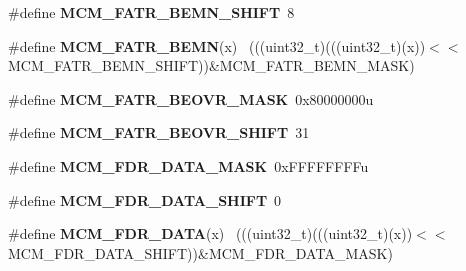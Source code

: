 \begin{DoxyCompactItemize}
\item 
\hypertarget{group___m_c_m___register___masks_ga88340d50a4a5e89775d655534b423fa2}{}\#define {\bfseries M\+C\+M\+\_\+\+F\+A\+T\+R\+\_\+\+B\+E\+M\+N\+\_\+\+S\+H\+I\+F\+T}~8\label{group___m_c_m___register___masks_ga88340d50a4a5e89775d655534b423fa2}

\item 
\hypertarget{group___m_c_m___register___masks_ga79d7604d5e9570d49dd65bf1c66ef959}{}\#define {\bfseries M\+C\+M\+\_\+\+F\+A\+T\+R\+\_\+\+B\+E\+M\+N}(x)                                              ~(((uint32\+\_\+t)(((uint32\+\_\+t)(x))$<$$<$M\+C\+M\+\_\+\+F\+A\+T\+R\+\_\+\+B\+E\+M\+N\+\_\+\+S\+H\+I\+F\+T))\&M\+C\+M\+\_\+\+F\+A\+T\+R\+\_\+\+B\+E\+M\+N\+\_\+\+M\+A\+S\+K)\label{group___m_c_m___register___masks_ga79d7604d5e9570d49dd65bf1c66ef959}

\item 
\hypertarget{group___m_c_m___register___masks_ga27c59e31d119c803390a03833ded4882}{}\#define {\bfseries M\+C\+M\+\_\+\+F\+A\+T\+R\+\_\+\+B\+E\+O\+V\+R\+\_\+\+M\+A\+S\+K}~0x80000000u\label{group___m_c_m___register___masks_ga27c59e31d119c803390a03833ded4882}

\item 
\hypertarget{group___m_c_m___register___masks_ga081bb0512d73dc58b5cde4f3291b48da}{}\#define {\bfseries M\+C\+M\+\_\+\+F\+A\+T\+R\+\_\+\+B\+E\+O\+V\+R\+\_\+\+S\+H\+I\+F\+T}~31\label{group___m_c_m___register___masks_ga081bb0512d73dc58b5cde4f3291b48da}

\item 
\hypertarget{group___m_c_m___register___masks_ga422d011b3e2b1f137c16ff2c9771819b}{}\#define {\bfseries M\+C\+M\+\_\+\+F\+D\+R\+\_\+\+D\+A\+T\+A\+\_\+\+M\+A\+S\+K}~0x\+F\+F\+F\+F\+F\+F\+F\+Fu\label{group___m_c_m___register___masks_ga422d011b3e2b1f137c16ff2c9771819b}

\item 
\hypertarget{group___m_c_m___register___masks_gaafbf98dfdf92b662f1221476bb031602}{}\#define {\bfseries M\+C\+M\+\_\+\+F\+D\+R\+\_\+\+D\+A\+T\+A\+\_\+\+S\+H\+I\+F\+T}~0\label{group___m_c_m___register___masks_gaafbf98dfdf92b662f1221476bb031602}

\item 
\hypertarget{group___m_c_m___register___masks_ga7bd9c3cfc0b39dfbe8e2d01bad3f2425}{}\#define {\bfseries M\+C\+M\+\_\+\+F\+D\+R\+\_\+\+D\+A\+T\+A}(x)                                                ~(((uint32\+\_\+t)(((uint32\+\_\+t)(x))$<$$<$M\+C\+M\+\_\+\+F\+D\+R\+\_\+\+D\+A\+T\+A\+\_\+\+S\+H\+I\+F\+T))\&M\+C\+M\+\_\+\+F\+D\+R\+\_\+\+D\+A\+T\+A\+\_\+\+M\+A\+S\+K)\label{group___m_c_m___register___masks_ga7bd9c3cfc0b39dfbe8e2d01bad3f2425}


\end{DoxyCompactItemize}
